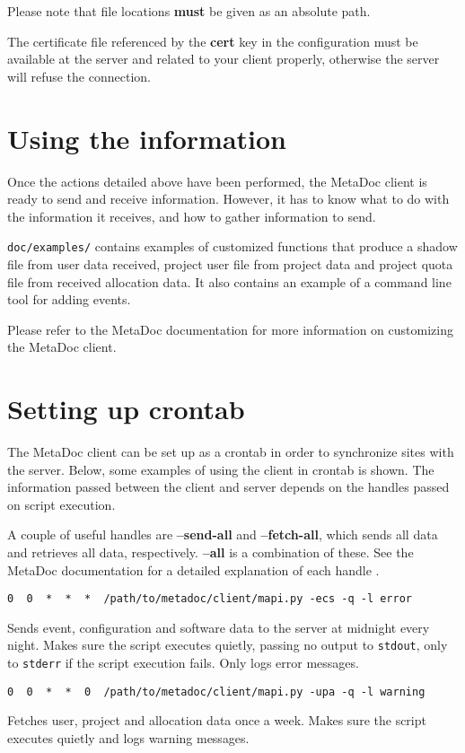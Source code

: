 \documentclass[titlepage, a4paper,10pt]{article}
\begin{document}
Please note that file locations \textbf{must} be given as an absolute path.

The certificate file referenced by the \textbf{cert} key in the configuration
must be available at the server and related to your client properly, otherwise
the server will refuse the connection.

\section{Using the information}
Once the actions detailed above have been performed, the MetaDoc client is
ready to send and receive information. However, it has to know what to do with
the information it receives, and how to gather information to send. 

\texttt{doc/examples/} contains examples of customized functions that produce a
shadow file from user data received, project user file from project data and
project quota file from received allocation data. It also contains an example
of a command line tool for adding events.

Please refer to the MetaDoc documentation \cite{mdoc} for more information on
customizing the MetaDoc client. 

\section{Setting up crontab}
The MetaDoc client can be set up as a crontab in order to synchronize sites
with the server. Below, some examples of using the client in crontab is shown.
The information passed between the client and server depends on the handles
passed on script execution. 

A couple of useful handles are \textbf{--send-all} and \textbf{--fetch-all},
which sends all data and retrieves all data, respectively. \textbf{--all} is a
combination of these.  See the MetaDoc documentation for a detailed explanation
of each handle \cite{mdoc}.

\begin{verbatim}
0  0  *  *  *  /path/to/metadoc/client/mapi.py -ecs -q -l error
\end{verbatim}
Sends event, configuration and software data to the server at midnight every
night. Makes sure the script executes quietly, passing no output to
\texttt{stdout}, only to \texttt{stderr} if the script execution fails. Only
logs error messages.

\begin{verbatim}
0  0  *  *  0  /path/to/metadoc/client/mapi.py -upa -q -l warning
\end{verbatim}
Fetches user, project and allocation data once a week. Makes sure the script
executes quietly and logs warning messages.
\end{document}
